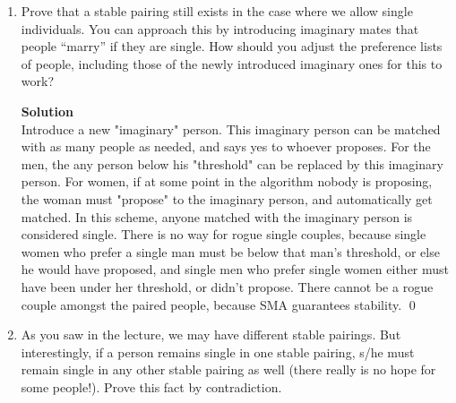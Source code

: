\documentclass[11pt]{article}
\newenvironment{Parts}{\begin{enumerate}[label=(\alph*)]}{\end{enumerate}}
\newcommand*{\Part}{\item}
\begin{document}
\begin{Parts}
\Part Prove that a stable pairing still exists in the case where we allow single individuals. You can approach this by
introducing imaginary mates that people ``marry''
if they are single. How should you adjust the preference lists of
people, including those of the newly introduced imaginary ones for
this to work?

\begin{mdframed} \textbf{Solution} \\
Introduce a new "imaginary" person. This imaginary person can be matched with as many people as needed, and says yes to whoever proposes. For the men, the any person below his "threshold" can be replaced by this imaginary person. For women, if at some point in the algorithm nobody is proposing, the woman must "propose" to the imaginary person, and automatically get matched. In this scheme, anyone matched with the imaginary person is considered single. There is no way for rogue single couples, because single women who prefer a single man must be below that man's threshold, or else he would have proposed, and single men who prefer single women either must have been under her threshold, or didn't propose. There cannot be a rogue couple amongst the paired people, because SMA guarantees stability. \qed
\end{mdframed}

\Part As you saw in the lecture, we may have different stable pairings. But
interestingly, if a person remains single in one stable pairing, s/he
must remain single in any other stable pairing as well (there really
is no hope for some people!). Prove this fact by contradiction.


\end{Parts}
\end{document}
